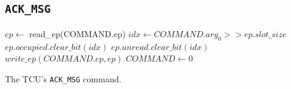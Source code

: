 \subsection{\texttt{ACK\_MSG}}

\begin{algorithm}[H]
    $ep \gets$ read\_ep(COMMAND.ep)\;
    \BlankLine
    $idx \gets COMMAND.arg_0 >> ep.slot\_size$\;
    \BlankLine
    \cbstart
    \cbend
    \BlankLine
    $ep.occupied.clear\_bit(idx)$\;
    $ep.unread.clear\_bit(idx)$\;
    $write\_ep(COMMAND.ep, ep)$\;
    \BlankLine
    \BlankLine
    $COMMAND \gets 0$\;
    \caption{The TCU's \texttt{ACK\_MSG} command.}
\end{algorithm}
